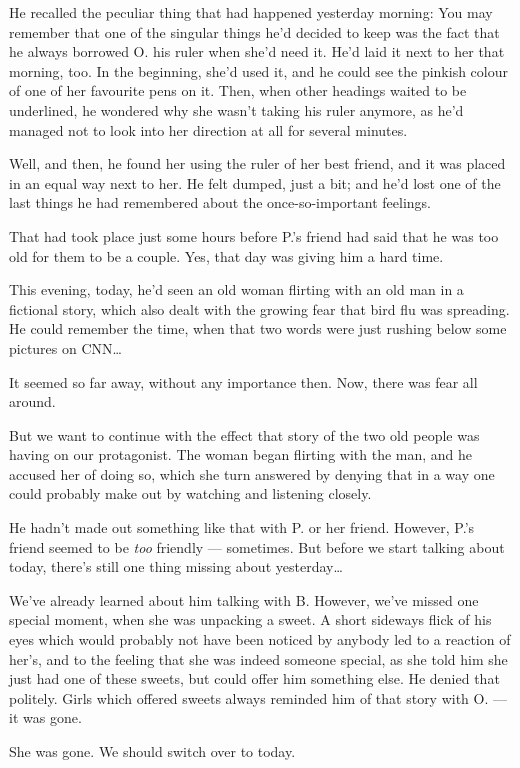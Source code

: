 He recalled the peculiar thing that had happened yesterday morning: You may remember that one of the singular things he'd decided to keep was the fact that he always borrowed O. his ruler when she'd need it. He'd laid it next to her that morning, too. In the beginning, she'd used it, and he could see the pinkish colour of one of her favourite pens on it. Then, when other headings waited to be underlined, he wondered why she wasn't taking his ruler anymore, as he'd managed not to look into her direction at all for several minutes.

Well, and then, he found her using the ruler of her best friend, and it was placed in an equal way next to her. 
He felt dumped, just a bit; and he'd lost one of the last things he had remembered about the once-so-important feelings.

That had took place just some hours before P.'s friend had said that he was too old for them to be a couple. Yes, that day was giving him a hard time.

This evening, today, he'd seen an old woman flirting with an old man in a fictional story, which also dealt with the growing fear that bird flu was spreading. He could remember the time, when that two words were just rushing below some pictures on CNN\ldots

It seemed so far away, without any importance then. Now, there was fear all around.

But we want to continue with the effect that story of the two old people was having on our protagonist. The woman began flirting with the man, and he accused her of doing so, which she turn answered by denying that in a way one could probably make out by watching and listening closely.

He hadn't made out something like that with P. or her friend. However, P.'s friend seemed to be \emph{too} friendly --- sometimes. But before we start talking about today, there's still one thing missing about yesterday\ldots

We've already learned about him talking with B. However, we've missed one special moment, when she was unpacking a sweet. A short sideways flick of his eyes which would probably not have been noticed by anybody led to a reaction of her's, and to the feeling that she was indeed someone special, as she told him she just had one of these sweets, but could offer him something else. He denied that politely. 
Girls which offered sweets always reminded him of that story with O. --- it was gone.

She was gone. 
We should switch over to today. 

